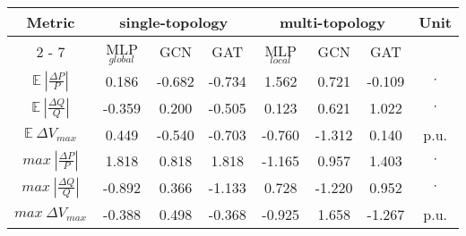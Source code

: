 \makegapedcells\begin{tabular}{|c||c|c|c||c|c|c||c|}%
                   \hline%
                   \multirow{2}{*}{Metric} & \multicolumn{3}{c||}{single{-}topology} & \multicolumn{3}{c||}{multi{-}topology}& \multirow{2}{*}{Unit}\\%
                   \cline{2%
                   -%
                   7}%
                   & MLP$_{global}$ & GCN      & GAT      & MLP$_{local}$ & GCN      & GAT      &         \\%
                   \hline%
                   $\mathbb{E} \ |\frac{\Delta P}{P}|$ & 0.186          & {-}0.682 & {-}0.734 & 1.562         & 0.721    & {-}0.109& $\cdot$\\%
                   \hline%
                   $\mathbb{E} \ |\frac{\Delta Q}{Q}|$ & {-}0.359       & 0.200    & {-}0.505 & 0.123         & 0.621    & 1.022    & $\cdot$ \\%
                   \hline%
                   $\mathbb{E} \ \Delta V_{max}$       & 0.449          & {-}0.540 & {-}0.703 & {-}0.760      & {-}1.312 & 0.140    & p.u.    \\%
                   \hline%
                   $max \ |\frac{\Delta P}{P}|$        & 1.818          & 0.818    & 1.818    & {-}1.165      & 0.957    & 1.403    & $\cdot$ \\%
                   \hline%
                   $max \ |\frac{\Delta Q}{Q}|$        & {-}0.892       & 0.366    & {-}1.133 & 0.728         & {-}1.220 & 0.952    & $\cdot$ \\%
                   \hline%
                   $max \ \Delta V_{max}$              & {-}0.388       & 0.498    & {-}0.368 & {-}0.925      & 1.658    & {-}1.267 & p.u.    \\%
                   \hline%
\end{tabular}
